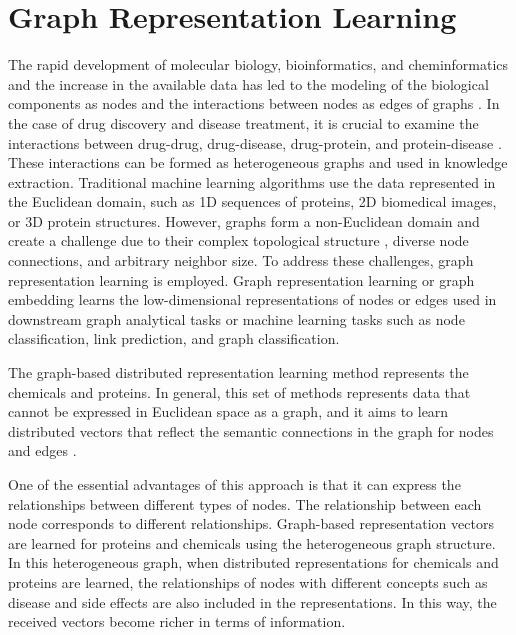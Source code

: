 \section{Graph Representation Learning}
\label{section:graph_rep_le}
The rapid development of molecular biology, bioinformatics, and cheminformatics and the increase in the available data has led to the modeling of the biological components as nodes and the interactions between nodes as edges of graphs \cite{mason2007graph, pavlopoulos2011using, ricard2006biological}. In the case of drug discovery and disease treatment, it is crucial to examine the interactions between drug-drug, drug-disease, drug-protein, and protein-disease \cite{daminelli2012drug, davis2009comparative}. These interactions can be formed as heterogeneous graphs and used in knowledge extraction. Traditional machine learning algorithms use the data represented in the Euclidean domain, such as 1D sequences of proteins, 2D biomedical images, or 3D protein structures. However, graphs form a non-Euclidean domain and create a challenge due to their complex topological structure \cite{bronstein2017geometric, asif2021graph}, diverse node connections, and arbitrary neighbor size. To address these challenges, graph representation learning is employed. Graph representation learning or graph embedding learns the low-dimensional representations of nodes or edges used in downstream graph analytical tasks or machine learning tasks such as node classification, link prediction, and graph classification.

The graph-based distributed representation learning method represents the chemicals and proteins. In general, this set of methods represents data that cannot be expressed in Euclidean space as a graph, and it aims to learn distributed vectors that reflect the semantic connections in the graph for nodes and edges \cite{wu2019comprehensive}. %

One of the essential advantages of this approach is that it can express the relationships between different types of nodes. The relationship between each node corresponds to different relationships. Graph-based representation vectors are learned for proteins and chemicals using the heterogeneous graph structure. In this heterogeneous graph, when distributed representations for chemicals and proteins are learned, the relationships of nodes with different concepts such as disease and side effects are also included in the representations. In this way, the received vectors become richer in terms of information. 


